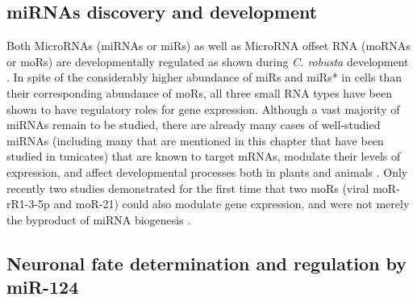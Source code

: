 \documentclass[graybox]{svmult}
\begin{document}
\subsection{miRNAs discovery and development}

Both MicroRNAs (miRNAs or miRs) as well as MicroRNA offset RNA (moRNAs or moRs) 
are developmentally regulated as shown during \textit{C. robusta} development 
\cite{Shi2009}. In spite of the considerably higher abundance of miRs and 
miRs* in cells than their corresponding abundance of moRs, all three small RNA 
types have been shown to have regulatory roles for gene expression. Although a 
vast majority of miRNAs remain to be studied, there are already many cases of 
well-studied miRNAs (including many that are mentioned in this chapter that have 
been studied in tunicates) that are known to target mRNAs, modulate their levels 
of expression, and affect developmental processes both in plants and animals 
\cite{Zhao2018}. Only recently two studies demonstrated for 
the first time that two moRs (viral moR-rR1-3-5p and moR-21) could also 
modulate gene expression, and were not merely the byproduct of miRNA biogenesis 
\cite{UMBACH2010592, Zhao2016}.

\subsection{Neuronal fate determination and regulation by miR-124}
\end{document}
